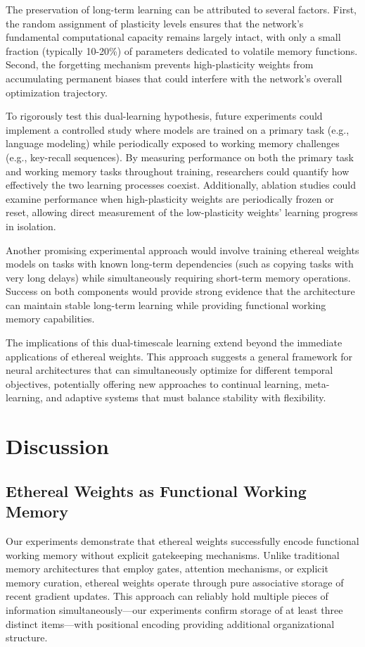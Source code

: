 \documentclass{article} %
\begin{document}
The preservation of long-term learning can be attributed to several factors. First, the random assignment of plasticity levels ensures that the network's fundamental computational capacity remains largely intact, with only a small fraction (typically 10-20\%) of parameters dedicated to volatile memory functions. Second, the forgetting mechanism prevents high-plasticity weights from accumulating permanent biases that could interfere with the network's overall optimization trajectory.

To rigorously test this dual-learning hypothesis, future experiments could implement a controlled study where models are trained on a primary task (e.g., language modeling) while periodically exposed to working memory challenges (e.g., key-recall sequences). By measuring performance on both the primary task and working memory tasks throughout training, researchers could quantify how effectively the two learning processes coexist. Additionally, ablation studies could examine performance when high-plasticity weights are periodically frozen or reset, allowing direct measurement of the low-plasticity weights' learning progress in isolation.

Another promising experimental approach would involve training ethereal weights models on tasks with known long-term dependencies (such as copying tasks with very long delays) while simultaneously requiring short-term memory operations. Success on both components would provide strong evidence that the architecture can maintain stable long-term learning while providing functional working memory capabilities.

The implications of this dual-timescale learning extend beyond the immediate applications of ethereal weights. This approach suggests a general framework for neural architectures that can simultaneously optimize for different temporal objectives, potentially offering new approaches to continual learning, meta-learning, and adaptive systems that must balance stability with flexibility.

\section{Discussion}

\subsection{Ethereal Weights as Functional Working Memory}

Our experiments demonstrate that ethereal weights successfully encode functional working memory without explicit gatekeeping mechanisms. Unlike traditional memory architectures that employ gates, attention mechanisms, or explicit memory curation, ethereal weights operate through pure associative storage of recent gradient updates. This approach can reliably hold multiple pieces of information simultaneously—our experiments confirm storage of at least three distinct items—with positional encoding providing additional organizational structure.
\end{document}
